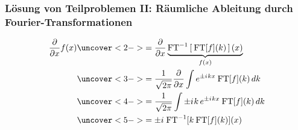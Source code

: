 \documentclass{beamer}
\newcommand{\iu}{{i\mkern1mu}} 	%
\newcommand{\FT}{\mathrm{FT}}
\newcommand{\absatz}{\vskip3mm}
\begin{document}




\begin{frame}[t] %
  \frametitle{Lösung von Teilproblemen II: Räumliche Ableitung durch Fourier-Transformationen}
  \begin{align*}
  \frac{\partial }{\partial x}f(x)
      &\uncover<2->{= \frac{\partial }{\partial x} \underbrace{\FT^{-1}\left[\: \FT[f](k) \, \right](x)}_{f(x)} }  \\
      &\uncover<3->{= \frac{1}{\sqrt{2\pi}} \frac{\partial }{\partial x}  \int e^{\pm \iu kx} \:\FT[f](k) \,dk }\\
      &\uncover<4->{= \frac{1}{\sqrt{2\pi}}  \int \pm \iu k\, e^{\pm \iu kx} \:\FT[f](k) \,dk }\\
      &\uncover<5->{=\pm \iu \:\FT^{-1} [k \:\FT[f](k)] (x) }
  \end{align*}

  
  \absatz

\end{frame}
\end{document}
